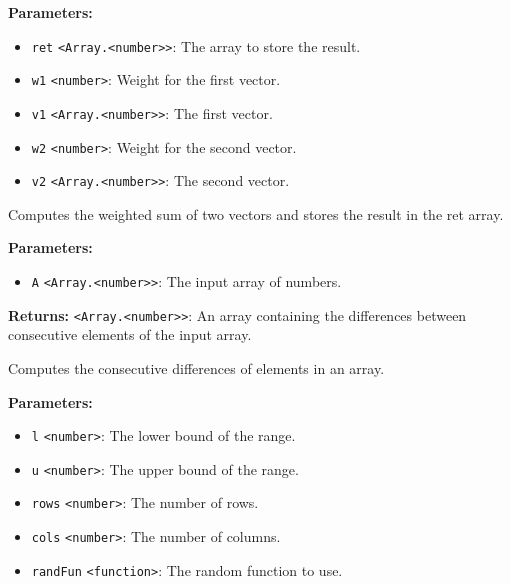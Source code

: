 \documentclass[12pt,a4paper]{article}
\begin{document}
\vspace{5mm}
\noindent {}


\noindent \textbf{Parameters:}
\begin{itemize}
  \item \texttt{ret} \texttt{<Array.<number>>}: The array to store the result.
  \item \texttt{w1} \texttt{<number>}: Weight for the first vector.
  \item \texttt{v1} \texttt{<Array.<number>>}: The first vector.
  \item \texttt{w2} \texttt{<number>}: Weight for the second vector.
  \item \texttt{v2} \texttt{<Array.<number>>}: The second vector.
\end{itemize}

\noindent Computes the weighted sum of two vectors and stores the result in the \textasciigrave{}ret\textasciigrave{} array.

\vspace{5mm}
\noindent {}


\noindent \textbf{Parameters:}
\begin{itemize}
  \item \texttt{A} \texttt{<Array.<number>>}: The input array of numbers.
\end{itemize}

\noindent \textbf{Returns:} \texttt{<Array.<number>>}: An array containing the differences between consecutive elements of the input array.

\noindent Computes the consecutive differences of elements in an array.

\vspace{5mm}
\noindent {}


\noindent \textbf{Parameters:}
\begin{itemize}
  \item \texttt{l} \texttt{<number>}: The lower bound of the range.
  \item \texttt{u} \texttt{<number>}: The upper bound of the range.
  \item \texttt{rows} \texttt{<number>}: The number of rows.
  \item \texttt{cols} \texttt{<number>}: The number of columns.
  \item \texttt{randFun} \texttt{<function>}: The random function to use.
\end{itemize}
\end{document}
